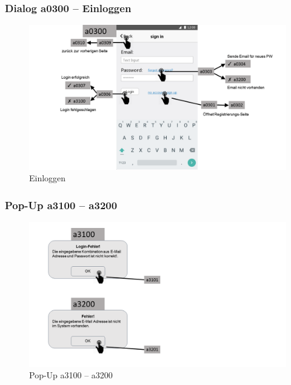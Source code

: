 \documentclass[a4paper,12pt,oneside]{scrartcl}
\begin{document}
\subsubsection{Dialog a0300 – Einloggen}
\begin{figure}[!htbp]
\centering
\noindent\includegraphics[width=\linewidth,height=\textheight,keepaspectratio]{Dialoge/a0300}
\caption{Einloggen}
\end{figure}
\FloatBarrier

\subsubsection{Pop-Up a3100 – a3200}
\begin{figure}[!htbp]
\centering
\noindent\includegraphics[width=\linewidth,height=\textheight,keepaspectratio]{Dialoge/a0300p}
\caption{Pop-Up a3100 – a3200}
\end{figure}
\FloatBarrier
\end{document}

